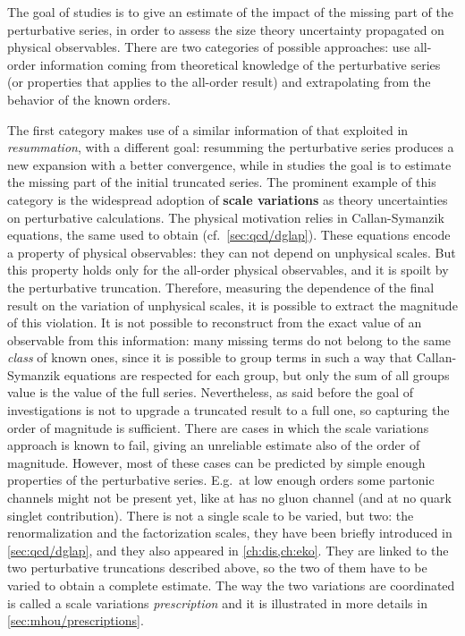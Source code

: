 
The goal of \mhou studies is to give an estimate of the impact of the missing
part of the perturbative series, in order to assess the size theory uncertainty
propagated on physical observables.
%
There are two categories of possible approaches: use all-order information
coming from theoretical knowledge of the perturbative series (or properties
that applies to the all-order result) and extrapolating from the behavior of
the known orders.

The first category makes use of a similar information of that exploited in
\textit{resummation}, with a different goal: resumming the perturbative series
produces a new expansion with a better convergence, while in \mhou studies the
goal is to estimate the missing part of the initial truncated series.
%
The prominent example of this category is the widespread adoption of
\textbf{scale variations} as theory uncertainties on perturbative calculations.
The physical motivation relies in Callan-Symanzik equations, the same used to
obtain \dglap (cf.\ \cref{sec:qcd/dglap}).
%
These equations encode a property of physical observables: they can not depend
on unphysical scales.
But this property holds only for the all-order physical observables, and it is
spoilt by the perturbative truncation.
Therefore, measuring the dependence of the final result on the variation of
unphysical scales, it is possible to extract the magnitude of this violation. 
%
It is not possible to reconstruct from the exact value of an observable from
this information: many missing terms do not belong to the same \textit{class}
of known ones, since it is possible to group terms in such a way that
Callan-Symanzik equations are respected for each group, but only the sum of all
groups value is the value of the full series.
%
Nevertheless, as said before the goal of \mhou investigations is not to upgrade
a truncated result to a full one, so capturing the order of magnitude is
sufficient.
%
There are cases in which the scale variations approach is known to fail, giving
an unreliable estimate also of the order of magnitude.
However, most of these cases can be predicted by simple enough properties of
the perturbative series.
E.g.\ at low enough orders some partonic channels might not be present yet,
like \dis at \lo has no gluon channel (and at \nlo no quark singlet
contribution).
%
There is not a single scale to be varied, but two: the renormalization and the
factorization scales, they have been briefly introduced in
\cref{sec:qcd/dglap}, and they also appeared in \cref{ch:dis,ch:eko}.
They are linked to the two perturbative truncations described above, so the two
of them have to be varied to obtain a complete estimate.
The way the two variations are coordinated is called a scale variations
\textit{prescription} and it is illustrated in more details in
\cref{sec:mhou/prescriptions}. 

